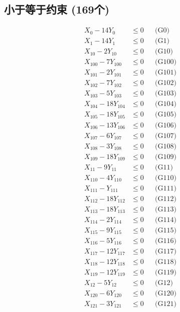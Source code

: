 \documentclass[a4paper,10pt]{article}
\begin{document}
\subsection{小于等于约束 (169个)}

\allowdisplaybreaks
{\small\begin{align}
X_{0} - 14Y_{0} &\leq 0 && \text{(G0)} \\
X_{1} - 14Y_{1} &\leq 0 && \text{(G1)} \\
X_{10} - 2Y_{10} &\leq 0 && \text{(G10)} \\
X_{100} - 7Y_{100} &\leq 0 && \text{(G100)} \\
X_{101} - 2Y_{101} &\leq 0 && \text{(G101)} \\
X_{102} - 7Y_{102} &\leq 0 && \text{(G102)} \\
X_{103} - 5Y_{103} &\leq 0 && \text{(G103)} \\
X_{104} - 18Y_{104} &\leq 0 && \text{(G104)} \\
X_{105} - 18Y_{105} &\leq 0 && \text{(G105)} \\
X_{106} - 13Y_{106} &\leq 0 && \text{(G106)} \\
X_{107} - 6Y_{107} &\leq 0 && \text{(G107)} \\
X_{108} - 3Y_{108} &\leq 0 && \text{(G108)} \\
X_{109} - 18Y_{109} &\leq 0 && \text{(G109)} \\
X_{11} - 9Y_{11} &\leq 0 && \text{(G11)} \\
X_{110} - 4Y_{110} &\leq 0 && \text{(G110)} \\
X_{111} - Y_{111} &\leq 0 && \text{(G111)} \\
X_{112} - 18Y_{112} &\leq 0 && \text{(G112)} \\
X_{113} - 18Y_{113} &\leq 0 && \text{(G113)} \\
X_{114} - 2Y_{114} &\leq 0 && \text{(G114)} \\
X_{115} - 9Y_{115} &\leq 0 && \text{(G115)} \\
\allowbreak
X_{116} - 5Y_{116} &\leq 0 && \text{(G116)} \\
X_{117} - 12Y_{117} &\leq 0 && \text{(G117)} \\
X_{118} - 12Y_{118} &\leq 0 && \text{(G118)} \\
X_{119} - 12Y_{119} &\leq 0 && \text{(G119)} \\
X_{12} - 5Y_{12} &\leq 0 && \text{(G12)} \\
X_{120} - 6Y_{120} &\leq 0 && \text{(G120)} \\
X_{121} - 3Y_{121} &\leq 0 && \text{(G121)} \\

\end{align}}
\end{document}
